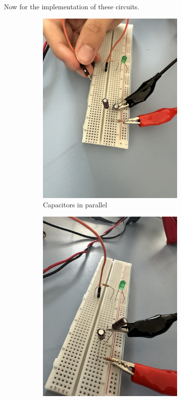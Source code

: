\documentclass[a4paper, 10pt]{article}
\begin{document}
						Now for the implementation of these circuits.
						\begin{figure}[h!]
							\begin{subfigure}{0.45\textwidth}
								\centering
								\includegraphics[width=0.8\textwidth]{./images/CapacitorsRealParallel.JPG}
								\caption{Capacitors in parallel}
								\label{fig:finished_capacitors_parallel_circuit}
							\end{subfigure}
							\hspace*{0.1\textwidth}
							\begin{subfigure}{0.45\textwidth}
								\centering
								\includegraphics[width=0.8\textwidth]{./images/CapacitorsRealSeries.JPG}

\end{subfigure}
\end{figure}
\end{document}

